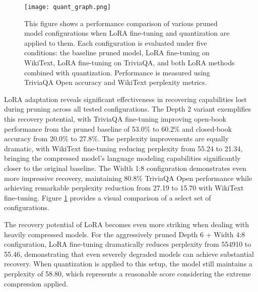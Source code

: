 
\begin{figure}[!htbp]
    \centering
    \texttt{[image: quant\_graph.png]}
    \caption[Comparison of LoRA and Quantized Models]{This figure shows a performance comparison of various pruned model configurations when LoRA fine-tuning and quantization are applied to them. Each configuration is evaluated under five conditions: the baseline pruned model, LoRA fine-tuning on WikiText, LoRA fine-tuning on TriviaQA, and both LoRA methods combined with quantization. Performance is measured using TriviaQA Open accuracy and WikiText perplexity metrics.}
    \label{fig:graph_quant}
\end{figure}

LoRA adaptation reveals significant effectiveness in recovering capabilities lost during pruning across all tested configurations. The Depth 2 variant exemplifies this recovery potential, with TriviaQA fine-tuning improving open-book performance from the pruned baseline of 53.0\% to 60.2\% and closed-book accuracy from 20.0\% to 27.8\%. The perplexity improvements are equally dramatic, with WikiText fine-tuning reducing perplexity from 55.24 to 21.34, bringing the compressed model's language modeling capabilities significantly closer to the original baseline. The Width 1:8 configuration demonstrates even more impressive recovery, maintaining 80.8\% TriviaQA Open performance while achieving remarkable perplexity reduction from 27.19 to 15.70 with WikiText fine-tuning. Figure \ref{fig:graph_quant} provides a visual comparison of a select set of configurations.

The recovery potential of LoRA becomes even more striking when dealing with heavily compressed models. For the aggressively pruned Depth 6 + Width 4:8 configuration, LoRA fine-tuning dramatically reduces perplexity from 554910 to 55.46, demonstrating that even severely degraded models can achieve substantial recovery. When quantization is applied to this setup, the model still maintains a perplexity of 58.80, which represents a reasonable score considering the extreme compression applied.

